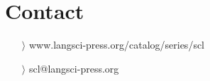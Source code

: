 \documentclass[
notumble,
nofoldmark,
]{leaflet}
\begin{document}
{{    \section{\color{LIGHTGRAY} \sffamily \Large Contact} 
	\begin{itemize}
	  \item[$\rangle$] \sffamily www.langsci-press.org/catalog/series/scl
	  \item[$\rangle$]\sffamily  scl@langsci-press.org 
	\end{itemize} 
  }
}

\usebox{\pageone}

\newpage

\usebox{\pagetwo}

\newpage

\usebox{\pagetwo}

\newpage

\usebox{\pagetwo}

\newpage

\usebox{\pageone}

\newpage

\usebox{\pageone}
 

\loggingall
\end{document}
